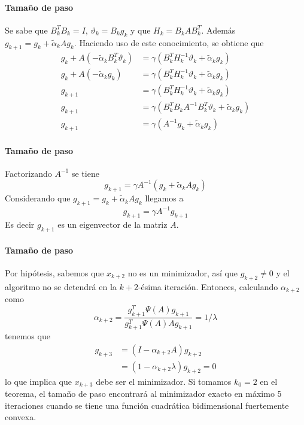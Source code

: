 \begin{frame}{\insertsectionhead}
    \framesubtitle{Tamaño de paso}
    Se sabe que $B^T_kB_k = I$, $\vartheta_k = B_kg_k$ y que $H_k = B_kAB_k^T$. Además $g_{k+1} = g_k+\tilde{\alpha}_kAg_k$. Haciendo uso de este conocimiento, se obtiene que
    \begin{align*}
        g_k+A(-\tilde{\alpha}_kB^T_k\vartheta_k) & = \gamma(B_k^TH_k^{-1}\vartheta_k+\tilde{\alpha}_kg_k)       \\
        g_k+A(-\tilde{\alpha}_kg_k)              & = \gamma(B_k^TH_k^{-1}\vartheta_k+\tilde{\alpha}_kg_k)       \\
        g_{k+1}                                  & = \gamma(B_k^TH_k^{-1}\vartheta_k+\tilde{\alpha}_kg_k)       \\
        g_{k+1}                                  & = \gamma(B_k^TB_kA^{-1}B_k^T\vartheta_k+\tilde{\alpha}_kg_k) \\
        g_{k+1}                                  & = \gamma(A^{-1}g_k+\tilde{\alpha}_kg_k)
    \end{align*}
\end{frame}

\begin{frame}{\insertsectionhead}
    \framesubtitle{Tamaño de paso}
    Factorizando $A^{-1}$ se tiene
    \begin{equation*}
        g_{k+1} = \gamma A^{-1}(g_k+\tilde{\alpha}_kAg_k)
    \end{equation*}
    Considerando que $g_{k+1} = g_k+\tilde{\alpha}_kAg_k$ llegamos a
    \begin{equation*}
        g_{k+1} = \gamma A^{-1}g_{k+1}
    \end{equation*}
    Es decir $g_{k+1}$ es un eigenvector de la matriz $A$.
\end{frame}

\begin{frame}{\insertsectionhead}
    \framesubtitle{Tamaño de paso}
    Por hipótesis, sabemos que $x_{k+2}$ no es un minimizador, así que $g_{k+2}\neq 0$ y el algoritmo no se detendrá en la $k+2$-ésima iteración. Entonces, calculando $\alpha_{k+2}$ como
    \begin{equation*}
        \alpha_{k+2}= \frac{g_{k+1}^T\Psi(A)g_{k+1}}{g_{k+1}^T\Psi(A)Ag_{k+1}} = 1/\lambda
    \end{equation*}
    tenemos que
    \begin{align*}
        g_{k+3} & = (I-\alpha_{k+2}A)g_{k+2}         \\
                & = (1-\alpha_{k+2}\lambda)g_{k+2}=0
    \end{align*}
    lo que implica que $x_{k+3}$ debe ser el minimizador. Si tomamos $k_0 =2$ en el teorema, el tamaño de paso encontrará al minimizador exacto en máximo 5 iteraciones cuando se tiene una función cuadrática bidimensional fuertemente convexa.
\end{frame}


